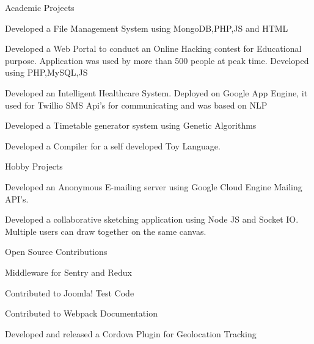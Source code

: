 \begin{cventries}
  \cventry
    {}
    {Academic Projects}
    {}
    {}
    {
      \begin{cvitems}
        \item {Developed a File Management System using MongoDB,PHP,JS and HTML}
        \item {Developed a Web Portal to conduct an Online Hacking contest for Educational purpose. Application was used by more than 500 people at peak time. Developed using PHP,MySQL,JS}
        \item{Developed an Intelligent Healthcare System. Deployed on Google App Engine, it used for Twillio SMS Api's for communicating and was based on NLP}
        \item{Developed a Timetable generator system using Genetic Algorithms}
        \item{Developed a Compiler for a self developed Toy Language.}
      \end{cvitems}
    }
  \cventry
    {}
    {Hobby Projects}
    {}
    {}
    {
      \begin{cvitems}
        \item {Developed an Anonymous E-mailing server using Google Cloud Engine Mailing API's. }
        \item {Developed a collaborative sketching application using Node JS and Socket IO. Multiple users can draw together on the same canvas. }
       \end{cvitems}
    }
  \cventry
    {}
    {Open Source Contributions}
    {}
    {}
    {
      \begin{cvitems}
        \item {Middleware for Sentry and Redux}
        \item {Contributed to Joomla! Test Code}
        \item {Contributed to Webpack Documentation}
        \item {Developed and released a Cordova Plugin for Geolocation Tracking}
      \end{cvitems}
    }
\end{cventries}

